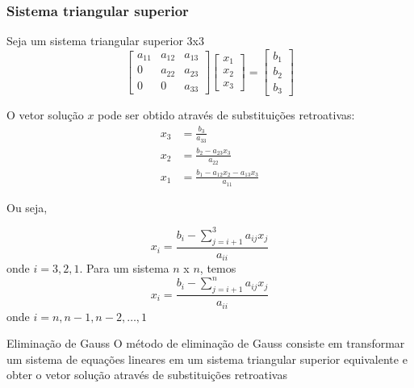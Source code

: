 \begin{frame}
\frametitle{Sistema triangular superior}

Seja um sistema triangular superior 3x3
\[
\begin{bmatrix}
a_{11} & a_{12} & a_{13} \\
0      & a_{22} & a_{23} \\
0      & 0      & a_{33}
\end{bmatrix}
\begin{bmatrix}
x_1 \\ x_2 \\ x_3
\end{bmatrix}
=
\begin{bmatrix}
b_1 \\ b_2 \\ b_3
\end{bmatrix}
\]

O vetor solução \( x\) pode ser obtido através de substituições retroativas:
\begin{align*}
x_3 &= \frac{b_3}{a_{33}} \\
x_2 & = \frac{b_2 - a_{23}x_3}{a_{22}} \\
x_1 &= \frac{b_1 - a_{12}x_2 - a_{13}x_3}{a_{11}}
\end{align*}
\end{frame}

\begin{frame}
Ou seja,

\[
x_i = \frac{b_i - \sum_{j=i+1}^{3} {a_{ij} x_j}}{a_{ii}}
\]
onde \(i = 3, 2, 1\). Para um sistema \(n\) x \(n\), temos
\[
x_i = \frac{b_i - \sum_{j=i+1}^{n} {a_{ij} x_j}}{a_{ii}}
\]
onde \(i = n, n-1, n-2, \ldots , 1\)

\begin{block}{Eliminação de Gauss}
O método de eliminação de Gauss consiste em transformar um sistema de equações lineares em um sistema triangular superior equivalente e obter o vetor solução através de substituições retroativas
\end{block}
\end{frame}

